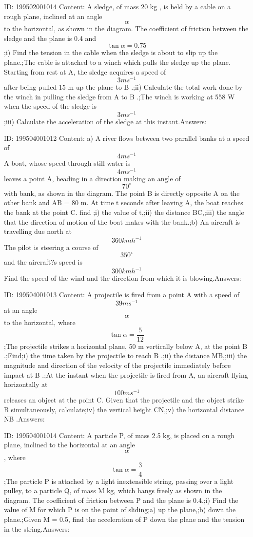 \documentclass{article}
\begin{document}
ID: 199502001014
Content:
A sledge, of mass 20 kg , is held by a cable on a rough plane, inclined at an angle \[\alpha\] to the horizontal, as shown in the diagram. The coefficient of friction between the sledge and the plane is 0.4 and \[\tan \alpha =0.75\];i) Find the tension in the cable when the sledge is about to slip up the plane.;The cable is attached to a winch which pulls the sledge up the plane. Starting from rest at A, the sledge acquires a speed of \[3ms^{-1} \] after being pulled 15 m up the plane to B .;ii) Calculate the total work done by the winch in pulling the sledge from A to B .;The winch is working at 558 W when the speed of the sledge is \[3ms^{-1} \];iii) Calculate the acceleration of the sledge at this instant.Answers:

ID: 199504001012
Content:
a) A river flows between two parallel banks at a speed of \[4ms^{-1}\] A boat, whose speed through still water is \[4ms^{-1}\] leaves a point A, heading in a direction making an angle of \[70^{\circ}\] with bank, as shown in the diagram. The point B is directly opposite A on the other bank and AB = 80 m. At time t seconds after leaving A, the boat reaches the bank at the point C. find ;i) the value of t,;ii) the distance BC,;iii) the angle that the direction of motion of the boat makes with the bank.;b) An aircraft is travelling due north at \[360kmh^{-1}\]  The pilot is steering a course of \[350^{\circ}\] and the aircraft?s speed is \[300kmh^{-1}\]  Find the speed of the wind and the direction from which it is blowing.Answers:

ID: 199504001013
Content:
A projectile is fired from a point A with a speed of \[39ms^{-1}\] at an angle \[\alpha\] to the horizontal, where \[\tan \alpha=\frac{5}{12}\] ;The projectile strikes a horizontal plane, 50 m vertically below A, at the point B .;Find;i) the time taken by the projectile to reach B .;ii) the distance MB,;iii) the magnitude and direction of the velocity of the projectile immediately before impact at B .;At the instant when the projectile is fired from A, an aircraft flying horizontally at \[100ms^{-1}\] releases an object at the point C. Given that the projectile and the object strike B simultaneously, calculate;iv) the vertical height CN,;v) the horizontal distance NB .Answers:

ID: 199504001014
Content:
A particle P, of mass 2.5 kg, is placed on a rough plane, inclined to the horizontal at an angle \[\alpha\], where \[\tan \alpha=\frac{3}{4}\] ;The particle P is attached by a light inextensible string, passing over a light pulley, to a particle Q, of mass M kg, which hangs freely as shown in the diagram. The coefficient of friction between P and the plane is 0.4.;i) Find the value of M for which P is on the point of sliding;a) up the plane,;b) down the plane.;Given M = 0.5, find the acceleration of P down the plane and the tension in the string.Answers:
\end{document}
